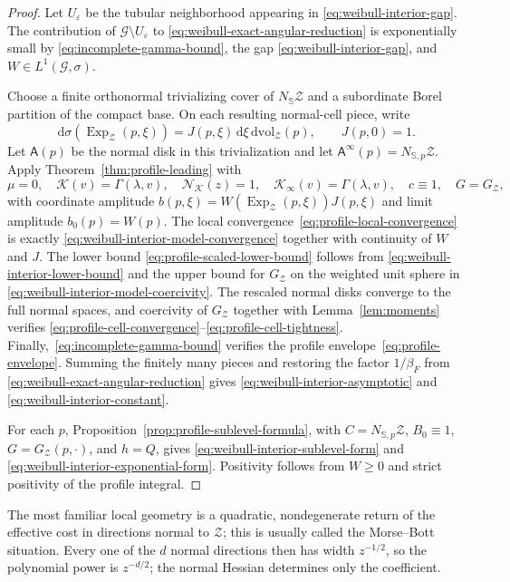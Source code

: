 \documentclass[11pt]{amsart}
\numberwithin{equation}{section}
\theoremstyle{definition}
\theoremstyle{remark}
\newcommand{\dd}{\,\mathrm{d}}
\newcommand{\dvol}{\,\mathrm{dvol}}
\newcommand{\eps}{\varepsilon}
\newcommand{\Afib}{\mathsf{A}}
\begin{document}
\begin{proof}
Let $U_\eps$ be the tubular neighborhood appearing in
\eqref{eq:weibull-interior-gap}.  The contribution of
$\mathcal G\setminus U_\eps$ to
\eqref{eq:weibull-exact-angular-reduction} is exponentially small by
\eqref{eq:incomplete-gamma-bound}, the gap
\eqref{eq:weibull-interior-gap}, and $W\in L^1(\mathcal G,\sigma)$.

Choose a finite orthonormal trivializing cover of
$N_{\mathbb S}\mathcal Z$ and a subordinate Borel partition of the compact
base.  On each resulting normal-cell piece, write
\[
 \dd\sigma(\operatorname{Exp}_{\mathcal Z}(p,\xi))
 =J(p,\xi)\dd\xi\dvol_{\mathcal Z}(p),
 \qquad J(p,0)=1.
\]
Let $\Afib(p)$ be the normal disk in this trivialization and let
$\Afib^\infty(p)=N_{\mathbb S,p}\mathcal Z$.  Apply
Theorem~\ref{thm:profile-leading} with
\[
 \mu=0,
 \quad \mathcal K(v)=\Gamma(\lambda,v),
 \quad \mathcal N_{\mathcal K}(z)=1,
 \quad \mathcal K_\infty(v)=\Gamma(\lambda,v),
 \quad c\equiv1,
 \quad G=G_{\mathcal Z},
\]
with coordinate amplitude
$b(p,\xi)=W(\operatorname{Exp}_{\mathcal Z}(p,\xi))J(p,\xi)$ and limit amplitude $b_0(p)=W(p)$.
The local convergence~\eqref{eq:profile-local-convergence} is exactly
\eqref{eq:weibull-interior-model-convergence} together with continuity of
$W$ and $J$.  The lower bound
\eqref{eq:profile-scaled-lower-bound} follows from
\eqref{eq:weibull-interior-lower-bound} and the upper bound for $G_{\mathcal Z}$ on the weighted unit sphere in
\eqref{eq:weibull-interior-model-coercivity}.  The rescaled normal disks converge
to the full normal spaces, and coercivity of $G_{\mathcal Z}$ together with
Lemma~\ref{lem:moments} verifies
\eqref{eq:profile-cell-convergence}--\eqref{eq:profile-cell-tightness}.
Finally,~\eqref{eq:incomplete-gamma-bound} verifies
the profile envelope~\eqref{eq:profile-envelope}.  Summing the finitely many
pieces and restoring the factor $1/\beta_F$ from
\eqref{eq:weibull-exact-angular-reduction} gives
\eqref{eq:weibull-interior-asymptotic} and
\eqref{eq:weibull-interior-constant}.

For each $p$, Proposition~\ref{prop:profile-sublevel-formula}, with
$C=N_{\mathbb S,p}\mathcal Z$, $B_0\equiv1$, $G=G_{\mathcal Z}(p,\cdot)$, and
$h=Q$, gives
\eqref{eq:weibull-interior-sublevel-form} and
\eqref{eq:weibull-interior-exponential-form}.  Positivity follows from
$W\ge0$ and strict positivity of the profile integral.
\end{proof}

The most familiar local geometry is a quadratic, nondegenerate return of the
effective cost in directions normal to $\mathcal Z$; this is usually called
the Morse--Bott situation.  Every one of the $d$ normal directions then has
width $z^{-1/2}$, so the polynomial power is $z^{-d/2}$; the normal Hessian
determines only the coefficient.
\end{document}
